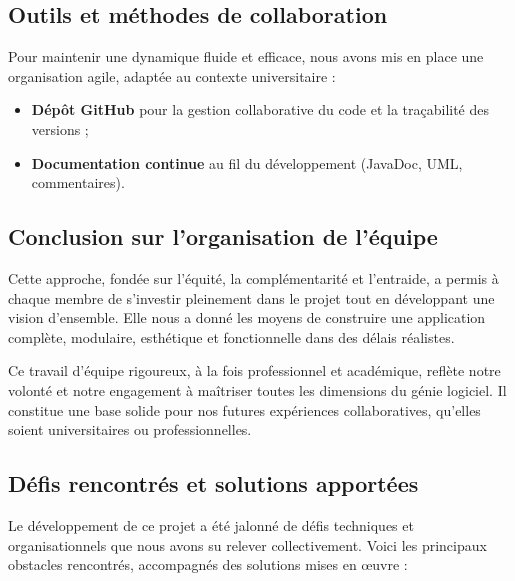 \subsection{Outils et méthodes de collaboration}

Pour maintenir une dynamique fluide et efficace, nous avons mis en place une organisation agile, adaptée au contexte universitaire :

\begin{itemize}
    
    \item \textbf{Dépôt GitHub} pour la gestion collaborative du code et la traçabilité des versions ;
     
    
    \item \textbf{Documentation continue} au fil du développement (JavaDoc, UML, commentaires).
\end{itemize}

\subsection{Conclusion sur l’organisation de l’équipe}

Cette approche, fondée sur l’équité, la complémentarité et l’entraide, a permis à chaque membre de s’investir pleinement dans le projet tout en développant une vision d’ensemble. Elle nous a donné les moyens de construire une application complète, modulaire, esthétique et fonctionnelle dans des délais réalistes.

Ce travail d’équipe rigoureux, à la fois professionnel et académique, reflète notre volonté  et notre engagement à maîtriser toutes les dimensions du génie logiciel. Il constitue une base solide pour nos futures expériences collaboratives, qu’elles soient universitaires ou professionnelles.
\subsection{Défis rencontrés et solutions apportées}

Le développement de ce projet a été jalonné de défis techniques et organisationnels que nous avons su relever collectivement. Voici les principaux obstacles rencontrés, accompagnés des solutions mises en œuvre :

